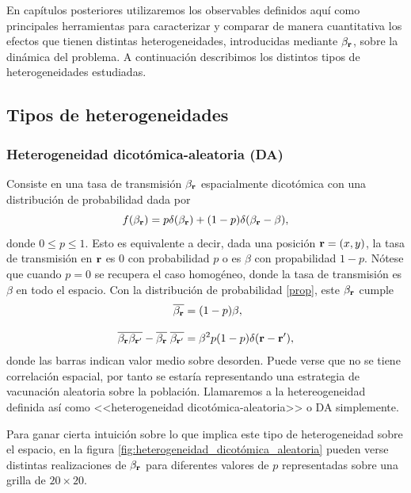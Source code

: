 En capítulos posteriores utilizaremos los observables definidos aquí como principales herramientas para caracterizar y comparar de manera cuantitativa
los efectos que tienen distintas heterogeneidades, introducidas mediante $\beta_{\vb r}$, sobre la dinámica del problema. A continuación describimos los distintos
tipos de heterogeneidades estudiadas. 

\subsection*{Tipos de heterogeneidades}

\subsubsection*{Heterogeneidad dicotómica-aleatoria (DA)}

Consiste en una tasa de transmisión $\beta_{\vb r}$ espacialmente dicotómica con una distribución de probabilidad dada por 
\begin{equation}
  f(\beta_{\vb r}) = p\delta(\beta_{\vb r}) + (1-p)\delta(\beta_{\vb r}-\beta),\label{prop}
\end{equation}
donde $0\leq p \leq 1$. Esto es equivalente a decir, dada una posición $\vb r = (x,y)$, la tasa de transmisión en $\vb r$ es $0$ con probabilidad $p$ o
es $\beta$ con propabilidad $1-p$. Nótese que cuando $p=0$ se recupera el caso homogéneo,
donde la tasa de transmisión es $\beta$ en todo el espacio. Con la distribución de probabilidad \ref{prop}, 
este $\beta_{\vb r}$ cumple 
\begin{align}
  \overline{\beta_{\vb{r}}}&= (1-p)\beta, \\[.3cm]
  \overline{\beta_{\vb r}\beta_{\vb{r'}}} - \overline{\beta_{\vb{r}}}\;\overline{\beta_{\vb{r'}}} &= \beta^2p(1-p)\delta(\vb r - \vb{r'}),
\end{align}
donde las barras indican valor medio sobre desorden. Puede verse que no se tiene correlación espacial, por tanto se estaría representando una estrategia de vacunación 
aleatoria sobre la población. Llamaremos a la hetereogeneidad definida así como <<heterogeneidad
dicotómica-aleatoria>> o DA simplemente.

Para ganar cierta intuición sobre lo que implica este tipo de heterogeneidad sobre el espacio, en la figura \ref{fig:heterogeneidad_dicotómica_aleatoria} 
pueden verse distintas realizaciones de $\beta_{\vb r}$ para diferentes valores de $p$ representadas sobre una grilla de $20 \times 20$.

